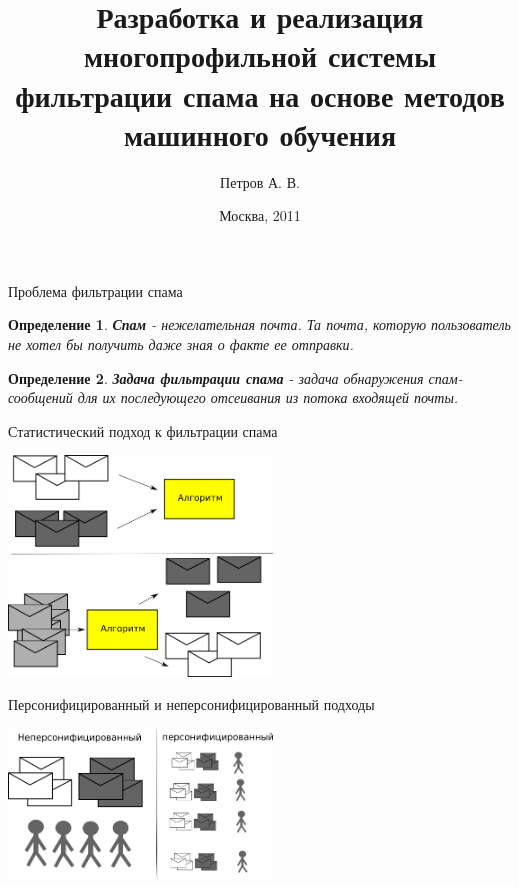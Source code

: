 \documentclass{beamer}
\newtheorem{define}{Определение}
\begin{document}
\title{Разработка и реализация многопрофильной системы фильтрации спама на основе методов машинного обучения}
\author{Петров А. В.}
\date{Москва, 2011}
\frame{\titlepage}

\begin{frame}{Проблема фильтрации спама}
    \begin{define}
        \textbf{Спам} - нежелательная почта. Та почта, которую пользователь не хотел бы получить даже зная о факте ее отправки.
    \end{define}
	\begin{define}
		\textbf{Задача фильтрации спама} - задача обнаружения спам-сообщений для их последующего отсеивания из потока входящей почты.
	\end{define}
\end{frame}

\begin{frame}{Статистический подход к фильтрации спама}
\begin{center}
    \includegraphics[width=7cm]{img/statmethod}
\end{center}
\end{frame}


\begin{frame}{Персонифицированный и неперсонифицированный подходы}
\begin{center}
    \includegraphics[width=7cm]{img/pers_nopers}
\end{center}
\end{frame}
\end{document}
